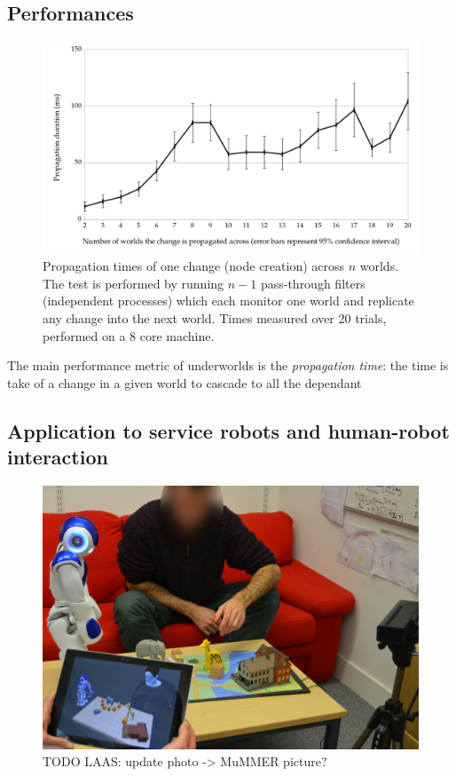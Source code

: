 \documentclass[conference]{IEEEtran}
\newcommand{\uwds}{{\sc underworlds}\xspace}
\begin{document}
\subsection{Performances}
\label{performances}

\begin{figure}
    \centering
    \includegraphics[width=\linewidth]{performances}
    \caption{Propagation times of one change (node creation)
    across $n$ worlds. The test is performed by running $n-1$ pass-through
    filters (independent processes) which each monitor one world and replicate
    any change into the next world. Times measured over 20 trials, performed on
    a 8 core machine.}
    \label{fig|performances}
\end{figure}

The main performance metric of \uwds is the \emph{propagation time}: the time is
take of a change in a given world to cascade to all the dependant 

\subsection{Application to service robots and human-robot interaction}

\begin{figure}
    \centering
    \includegraphics[width=\linewidth]{l2tor-photo2-blind}
    \caption{TODO LAAS: update photo -> MuMMER picture?}
    \label{fig|mummer-example}
\end{figure}
\end{document}
